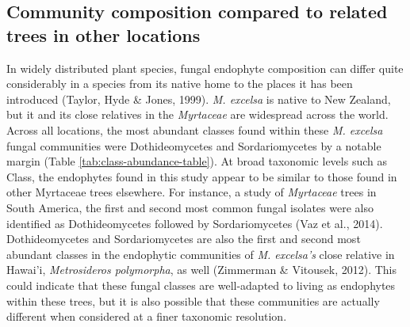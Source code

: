 \documentclass[fleqn,10pt,lineno]{wlpeerj} %
\begin{document}
\hypertarget{community-composition-compared-to-related-trees-in-other-locations}{%
\subsection*{Community composition compared to related trees in other locations}\label{community-composition-compared-to-related-trees-in-other-locations}}

In widely distributed plant species, fungal endophyte composition can differ quite considerably in a species from its native home to the places it has been introduced (Taylor, Hyde \& Jones, 1999). \emph{M. excelsa} is native to New Zealand, but it and its close relatives in the \emph{Myrtaceae} are widespread across the world. Across all locations, the most abundant classes found within these \emph{M. excelsa} fungal communities were Dothideomycetes and Sordariomycetes by a notable margin (Table \ref{tab:class-abundance-table}). At broad taxonomic levels such as Class, the endophytes found in this study appear to be similar to those found in other Myrtaceae trees elsewhere. For instance, a study of \emph{Myrtaceae} trees in South America, the first and second most common fungal isolates were also identified as Dothideomycetes followed by Sordariomycetes (Vaz et al., 2014). Dothideomycetes and Sordariomycetes are also the first and second most abundant classes in the endophytic communities of \emph{M. excelsa's} close relative in Hawai'i, \emph{Metrosideros polymorpha}, as well (Zimmerman \& Vitousek, 2012). This could indicate that these fungal classes are well-adapted to living as endophytes within these trees, but it is also possible that these communities are actually different when considered at a finer taxonomic resolution.
\end{document}
